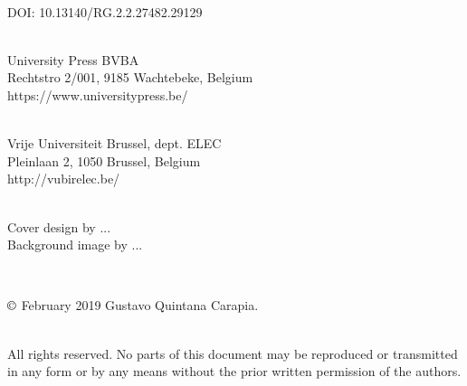 \documentclass[english, british, BCOR=5mm, DIV=12, fontsize=10pt]{scrbook}
\begin{document}
\newpage{}

~\vfill{}

{\footnotesize{}DOI: 10.13140/RG.2.2.27482.29129}\\ %
{\footnotesize{}~}{\footnotesize\par}

{\footnotesize{}University Press BVBA}\\
{\footnotesize{}Rechtstro 2/001, 9185 Wachtebeke, Belgium }\\
{\footnotesize{}https://www.universitypress.be/}\\
{\footnotesize{}~}{\footnotesize\par}

{\footnotesize{}Vrije Universiteit Brussel, dept. ELEC}\\
{\footnotesize{}Pleinlaan 2, 1050 Brussel, Belgium}\\
{\footnotesize{}http://vubirelec.be/}\\
{\footnotesize{}~}{\footnotesize\par}

{\footnotesize{}Cover design by ...}\\
{\footnotesize{}Background image by ...}{\footnotesize\par}
{\footnotesize{}~}{\footnotesize\par}

{\footnotesize{}$\copyright$ February 2019 Gustavo Quintana Carapia.}\\
{\footnotesize{}~}{\footnotesize\par}


{\footnotesize{}All rights reserved. No parts of this document may be reproduced or transmitted in any form or by any means without the prior written permission of the authors.}{\footnotesize\par}

{\footnotesize\par}

\newpage{}
{}



\tableofcontents{}
\end{document}
